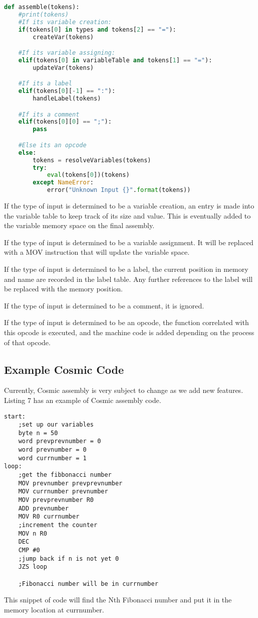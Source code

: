 \documentclass[conference]{IEEEtran}
\begin{document}
\begin{lstlisting}[language=Python, caption=Assembler Logic]
def assemble(tokens):
    #print(tokens)
    #If its variable creation:
    if(tokens[0] in types and tokens[2] == "="):
        createVar(tokens)

    #If its variable assigning:
    elif(tokens[0] in variableTable and tokens[1] == "="):
        updateVar(tokens)

    #If its a label
    elif(tokens[0][-1] == ":"):
        handleLabel(tokens)

    #If its a comment
    elif(tokens[0][0] == ";"):
        pass

    #Else its an opcode
    else: 
        tokens = resolveVariables(tokens)
        try:
            eval(tokens[0])(tokens)
        except NameError:
            error("Unknown Input {}".format(tokens))
\end{lstlisting}

If the type of input is determined to be a variable creation, an entry is made into the variable table to keep track of its size and value. This is eventually added to the variable memory space on the final assembly.

If the type of input is determined to be a variable assignment. It will be replaced with a MOV instruction that will update the variable space. 

If the type of input is determined to be a label, the current position in memory and name are recorded in the label table. Any further references to the label will be replaced with the memory position.

If the type of input is determined to be a comment, it is ignored.

If the type of input is determined to be an opcode, the function correlated with this opcode is executed, and the machine code is added depending on the process of that opcode. 


\subsection{Example Cosmic Code}
Currently, Cosmic assembly is very subject to change as we add new features. Listing 7 has an example of Cosmic assembly code.

\begin{lstlisting}[caption=Cosmic Assembly to find the Nth Fibonacci Number]
start:
    ;set up our variables
    byte n = 50
    word prevprevnumber = 0
    word prevnumber = 0
    word currnumber = 1
loop:
    ;get the fibbonacci number
    MOV prevnumber prevprevnumber
    MOV currnumber prevnumber
    MOV prevprevnumber R0
    ADD prevnumber
    MOV R0 currnumber
    ;increment the counter
    MOV n R0
    DEC
    CMP #0
    ;jump back if n is not yet 0
    JZS loop

    ;Fibonacci number will be in currnumber
\end{lstlisting}

This snippet of code will find the Nth Fibonacci number and put it in the memory location at currnumber.
\end{document}
